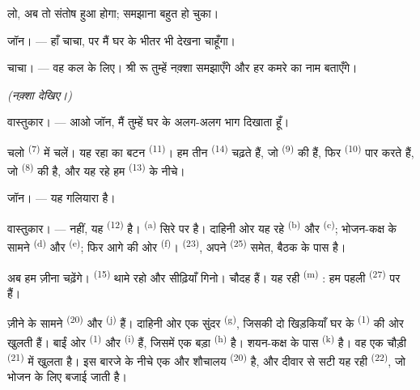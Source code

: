 लो, अब तो संतोष हुआ होगा; समझाना बहुत हो चुका।

\textsc{जॉन}। --- हाँ चाचा, पर मैं घर के भीतर भी देखना चाहूँगा।

\textsc{चाचा}। --- वह कल के लिए। श्री रू तुम्हें नक़्शा समझाएँगे और हर कमरे का
नाम बताएँगे।

\VUsaut{3.0mm}
\VUsaut{2.4mm}

{\centering\textit{(नक़्शा देखिए।)}\par}
\VUsaut{2.4mm}

\textsc{वास्तुकार}। --- आओ जॉन, मैं तुम्हें घर के अलग-अलग भाग दिखाता हूँ।

चलो  \textsuperscript{(7)} में चलें। यह रहा  का बटन
\textsuperscript{(11)}। हम तीन  \textsuperscript{(14)} चढ़ते हैं, जो
 \textsuperscript{(9)} की हैं, फिर 
\textsuperscript{(10)} पार करते हैं, जो 
\textsuperscript{(8)} की है, और यह
रहे हम  \textsuperscript{(13)} के नीचे।

\textsc{जॉन}। --- यह गलियारा है।

\textsc{वास्तुकार}। --- नहीं, यह  \textsuperscript{(12)} है।
 \textsuperscript{(a)} सिरे पर है। दाहिनी ओर यह रहे
 \textsuperscript{(b)} और  \textsuperscript{(c)};
भोजन-कक्ष के सामने  \textsuperscript{(d)} और 
\textsuperscript{(e)}; फिर आगे की ओर  \textsuperscript{(f)}।
 \textsuperscript{(23)}, अपने 
\textsuperscript{(25)} समेत, बैठक के पास है।

अब हम ज़ीना चढ़ेंगे।  \textsuperscript{(15)} थामे रहो और सीढ़ियाँ
गिनो। चौदह हैं। यह रही  \textsuperscript{(m)} : हम पहली
 \textsuperscript{(27)} पर हैं।

\VUsaut{3.0mm}
\VUsaut{3.0mm}

ज़ीने के सामने  \textsuperscript{(20)} और 
\textsuperscript{(j)} हैं। दाहिनी ओर एक सुंदर 
\textsuperscript{(g)}, जिसकी दो खिड़कियाँ घर के  \textsuperscript{(1)}
की ओर खुलती हैं। बाईं ओर  \textsuperscript{(1)} और
 \textsuperscript{(i)} हैं, जिसमें एक बड़ा 
\textsuperscript{(h)} है। शयन-कक्ष के पास 
\textsuperscript{(k)} है। वह एक चौड़ी  \textsuperscript{(21)} में
खुलता है। इस बारजे के नीचे एक और शौचालय \textsuperscript{(20)} है, और दीवार से
सटी यह रही  \textsuperscript{(22)}, जो भोजन के लिए बजाई जाती है।

